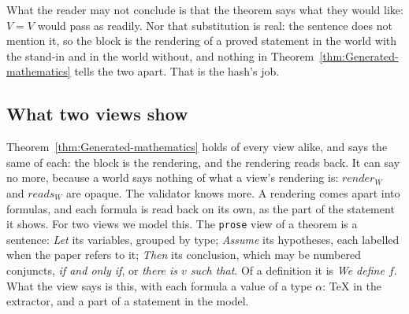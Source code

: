 \documentclass[acmsmall,screen,review,anonymous,nonacm]{acmart}
\begin{document}
What the reader may not conclude is that the theorem says what they would
like: $V = V$ would pass as readily. Nor that substitution is real: the
sentence does not mention it, so the block is the rendering of a proved
statement in the world with the stand-in and in the world without, and
nothing in Theorem~\ref{thm:Generated-mathematics} tells the two apart.
That is the hash's job.

\subsection{What two views show}\label{sec:views}

Theorem~\ref{thm:Generated-mathematics} holds of every view alike, and
says the same of each: the block is the rendering, and the rendering reads
back. It can say no more, because a world says nothing of what a view's
rendering is: $\mathit{render}_{W}$ and $\mathit{reads}_{W}$ are opaque.
The validator knows more. A rendering comes apart into formulas, and each
formula is read back on its own, as the part of the statement it shows.
For two views we model this. The \texttt{prose} view of a theorem is a
sentence: \emph{Let} its variables, grouped by type; \emph{Assume} its
hypotheses, each labelled when the paper refers to it; \emph{Then} its
conclusion, which may be numbered conjuncts, \emph{if and only if}, or
\emph{there is $v$ such that}. Of a definition it is \emph{We define $f$}.
What the view says is this, with each formula a value of a type $\alpha$:
\TeX{} in the extractor, and a part of a statement in the model.
\end{document}
